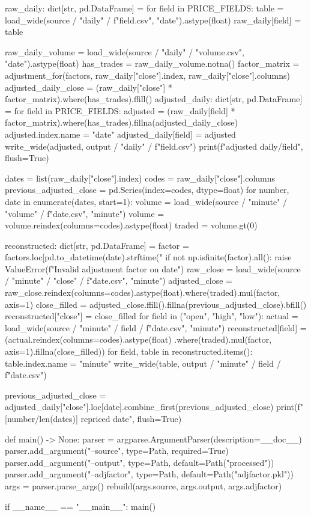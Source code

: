 \documentclass[UTF8,a4paper,fontset=fandol]{ctexart}
\begin{document}
\begin{ProjectCode}
    raw_daily: dict[str, pd.DataFrame] = {}
    for field in PRICE_FIELDS:
        table = load_wide(source / "daily" / f"{field}.csv", "date").astype(float)
        raw_daily[field] = table

    raw_daily_volume = load_wide(source / "daily" / "volume.csv", "date").astype(float)
    has_trades = raw_daily_volume.notna()
    factor_matrix = adjustment_for(factors, raw_daily["close"].index,
                                   raw_daily["close"].columns)
    adjusted_daily_close = (raw_daily["close"] * factor_matrix).where(has_trades).ffill()
    adjusted_daily: dict[str, pd.DataFrame] = {}
    for field in PRICE_FIELDS:
        adjusted = (raw_daily[field] * factor_matrix).where(has_trades).fillna(adjusted_daily_close)
        adjusted.index.name = "date"
        adjusted_daily[field] = adjusted
        write_wide(adjusted, output / "daily" / f"{field}.csv")
        print(f"adjusted daily/{field}", flush=True)

    dates = list(raw_daily["close"].index)
    codes = raw_daily["close"].columns
    previous_adjusted_close = pd.Series(index=codes, dtype=float)
    for number, date in enumerate(dates, start=1):
        volume = load_wide(source / "minute" / "volume" / f"{date}.csv", "minute")
        volume = volume.reindex(columns=codes).astype(float)
        traded = volume.gt(0)

        reconstructed: dict[str, pd.DataFrame] = {}
        factor = factors.loc[pd.to_datetime(date).strftime("%
        if not np.isfinite(factor).all():
            raise ValueError(f"Invalid adjustment factor on {date}")
        raw_close = load_wide(source / "minute" / "close" / f"{date}.csv", "minute")
        adjusted_close = raw_close.reindex(columns=codes).astype(float).where(traded).mul(factor, axis=1)
        close_filled = adjusted_close.ffill().fillna(previous_adjusted_close).bfill()
        reconstructed["close"] = close_filled
        for field in ("open", "high", "low"):
            actual = load_wide(source / "minute" / field / f"{date}.csv", "minute")
            reconstructed[field] = (actual.reindex(columns=codes).astype(float)
                                    .where(traded).mul(factor, axis=1).fillna(close_filled))
        for field, table in reconstructed.items():
            table.index.name = "minute"
            write_wide(table, output / "minute" / field / f"{date}.csv")

        previous_adjusted_close = adjusted_daily["close"].loc[date].combine_first(previous_adjusted_close)
        print(f"[{number}/{len(dates)}] repriced {date}", flush=True)


def main() -> None:
    parser = argparse.ArgumentParser(description=__doc__)
    parser.add_argument("--source", type=Path, required=True)
    parser.add_argument("--output", type=Path, default=Path("processed"))
    parser.add_argument("--adjfactor", type=Path, default=Path("adjfactor.pkl"))
    args = parser.parse_args()
    rebuild(args.source, args.output, args.adjfactor)


if __name__ == "__main__":
    main()
\end{ProjectCode}
\clearpage
\end{document}
